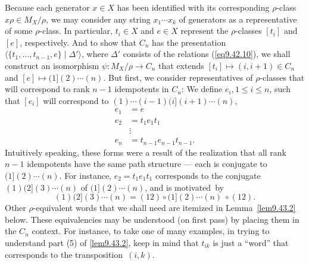\documentclass{surv-l}
\numberwithin{equation}{section}
\numberwithin{table}{section}
\numberwithin{figure}{section}
\theoremstyle{definition}
\begin{document}
Because each generator $x\in X$ has been identified with its
corresponding $\rho$-class $ x\rho\in M_{X}/\rho$, we may consider
any string $x_{1}\cdots x_{k}$ of generators as a representative
of some $\rho$-class. In particular, $t_{i}\in X$ and $e\in X$
represent the $\rho$-classes $[t_{i}]$ and $[e]$, respectively.
And to show that $C_{n}$ has the presentation
$\langle\{t_{1},\ldots, t_{n-1}, e\} \mid \Delta'\rangle$,
where $\Delta'$ consists of the relations (\ref{eq9.42.10}), we
shall construct an isomorphism $\psi : M_{X}/\rho\rightarrow
C_{n}$ that extends $[t_{i}]\mapsto(i, i+1)\in C_{n}$ and
$[e]\mapsto(1](2)\cdots(n)$. But first, we consider
representatives of $\rho$-classes that will correspond to rank
$n-1$ idempotents in $C_{n}$: We define $e_{i}, 1\leq i\leq n$,
such that $[e_{i}]$ will correspond to $(1)\cdots
(i-1)(i](i+1)\cdots (n)$,
\begin{equation}\label{eq9.43.1}
\begin{split}
e_{1} &=e \\
e_{2}&=t_{1}e_{1}t_{1} \\
&\vdots \\
e_{n}&=t_{n-1}e_{n-1}t_{n-1}.
\end{split}
\end{equation}
Intuitively speaking, these forms were a result of the realization
that all rank $n-1$ idempotents have the same path structure
--- each is conjugate to $(1](2)\cdots(n)$. For instance,
$e_{2}=t_{1}e_{1}t_{1}$ corresponds to the conjugate $(1)
(2](3)\cdots(n)$ of $(1](2)\cdots(n)$, and is motivated~by
\[
(1)(2](3)\cdots(n)=(12)\circ(1](2)\cdots(n)\ \circ (12).
\]
Other $\rho$-equivalent words that we shall need are itemized in
Lemma~\ref{lem9.43.2} below. These equivalencies may be understood
(on first pass) by placing them in the $C_{n}$ context. For
instance, to take one of many examples, in trying to understand
part (5) of \ref{lem9.43.2}, keep in mind that $t_{ik}$ is just a
``word'' that corresponds to the transposition~$(i, k)$.
\end{document}
